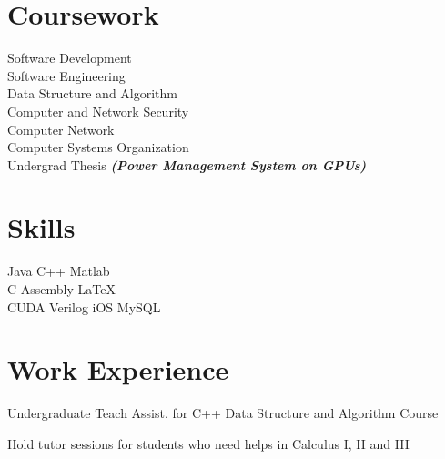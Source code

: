 \documentclass[]{deedy-resume-openfont}
\begin{document}
\begin{minipage}[t]{0.32\textwidth}

\section{Coursework}

Software Development \\
Software Engineering \\
Data Structure and Algorithm \\
Computer and Network Security \\
Computer Network \\
Computer Systems Organization \\
Undergrad Thesis {\footnotesize \textit{\textbf{(Power Management System on GPUs)}}} \\
\sectionsep


\section{Skills}
Java \textbullet{}  C++ \textbullet{} Matlab \\
C \textbullet{}  Assembly \textbullet{} \LaTeX\ \\ 
CUDA \textbullet{} Verilog \textbullet{} iOS \textbullet{} MySQL
\sectionsep

%
\section{Work Experience} 
Undergraduate Teach Assist. for C++ Data Structure and Algorithm Course

Hold tutor sessions for students who need helps in Calculus I, II and III
\sectionsep

%
%

\end{minipage} 
\hfill
\end{document}

